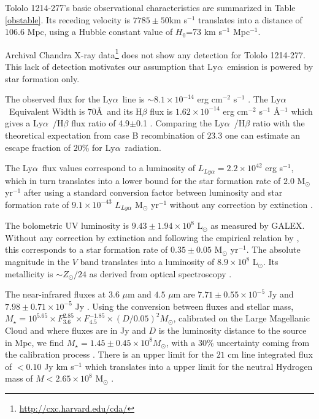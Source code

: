\documentclass[a4,useAMS,usenatbib,usegraphicx]{mn2e}
\newcommand{\tol}{Tololo 1214-277}
\newcommand{\lya}{\ifmmode{{\rm Ly}\alpha}\else Ly$\alpha$\ \fi}
\begin{document}
\tol's basic observational characteristics are summarized in Table \ref{obstable}.
Its receding velocity is $7785\pm 50$km s$^{-1}$ translates
into a distance of $106.6$ Mpc, using a Hubble constant value of $H_{0}$=73
km s$^{-1}$ Mpc$^{-1}$.

Archival Chandra X-ray data\footnote{\url{http://cxc.harvard.edu/cda/}} does not show any
detection for \tol. 
This lack of detection motivates our assumption that \lya emission is
powered by star formation only.

The observed flux for the \lya line is $\sim
8.1\times 10^{-14}$ erg cm$^{-2}$ s$^{-1}$ \citep{Thuan97}.
The \lya Equivalent Width is $70$\AA\ and its H$\beta$ flux is 
$1.62\times 10^{-14}$ erg cm$^{-2}$ s$^{-1}$ \AA$^{-1}$
which gives a \lya/H$\beta$ flux ratio of
4.9$\pm$0.1 \citep{Izotov04}.
Comparing the \lya/H$\beta$ ratio with the theoretical
expectation from case B recombination of $23.3$ \citep{Hummer1987} one
can estimate an escape fraction of $20$\% for \lya radiation.

The \lya flux values correspond to a luminosity of
$L_{Ly\alpha}=2.2\times 10^{42}$ erg s$^{-1}$, which in turn
translates  into a lower bound for the star formation rate of $2.0$
M$_{\odot}$ yr$^{-1}$ after using a standard conversion factor between
luminosity and star formation rate of $9.1\times 10^{-43}$
$L_{Ly\alpha}$ M$_{\odot}$ yr$^{-1}$ 
without any
correction by extinction
\citep{Kennicutt98}.


The bolometric UV luminosity is $9.43\pm1.94 \times 10^{8}$
L$_{\odot}$ as measured by GALEX. Without any correction by extinction
and following the empirical relation by \cite{Kennicutt98}, this
corresponds to a star formation rate of $0.35\pm 0.05$ M$_{\odot}$
yr$^{-1}$. 
The absolute magnitude in the $V$ band translates into a luminosity of
$8.9\times 10^{8}$ L$_{\odot}$.  
Its metallicity is $\sim Z_{\odot}/24$ as derived from
optical spectroscopy \citep{Izotov04}. 
%

The near-infrared fluxes at $3.6$ $\mu$m and $4.5$ $\mu$m are
$7.71\pm0.55\times 10^{-5}$ Jy and $7.98\pm0.71\times 10^{-5}$ Jy
\citep{2008ApJ...678..804E}.
Using the conversion between fluxes and
stellar mass, $M_{\star} =
10^{5.65} \times F_{3.6}^{2.85} \times F_{4.5}^{-1.85} \times
(D/0.05)^2 M_{\odot}$,  calibrated on the Large Magellanic Cloud 
and  where fluxes are in Jy and $D$ is the luminosity
distance to the source in Mpc, we find $M_{\star} = 1.45\pm0.45\times 10^{8}
M_{\odot}$, with a $30\%$ uncertainty coming from the calibration
process \citep{2012AJ....143..139E}.  
There is an upper limit for the  $21$ cm line integrated flux of $<0.10$
Jy km s$^{-1}$  which translates into a upper limit for the neutral
Hydrogen mass of $M<2.65\times 10^{8}$ M$_{\odot}$
\citep{pustilnikmartin07}. 
\end{document}
